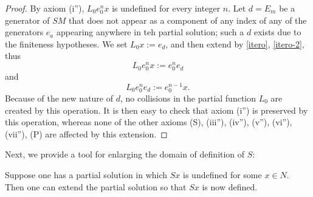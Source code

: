 \begin{proof}  By axiom (i''), $L_0 e_0^n x$ is undefined for every integer $n$.  Let $d = E_m$ be a generator of $SM$ that does not appear as a component of any index of any of the generators $e_a$ appearing anywhere in teh partial solution; such a $d$ exists due to the finiteness hypotheses.  We set $L_0 x := e_d$, and then extend by \eqref{itero}, \eqref{itero-2}, thus
$$L_0 e_0^n x := e_0^n e_d$$
and
$$L_0 e_0^n e_d := e_0^{n-1} x.$$
Because of the new nature of $d$, no collisions in the partial function $L_0$ are created by this operation.  It is then easy to check that axiom (i'') is preserved by this operation, whereas none of the other axioms (S), (iii''), (iv''), (v''), (vi''), (vii''), (P) are affected by this extension.
\end{proof}

Next, we provide a tool for enlarging the domain of definition of $S$:

\begin{proposition}[Enlarging $S$]\label{enlarge-S}  Suppose one has a partial solution in which $Sx$ is undefined for some $x \in N$.  Then one can extend the partial solution so that $Sx$ is now defined.
\end{proposition}

